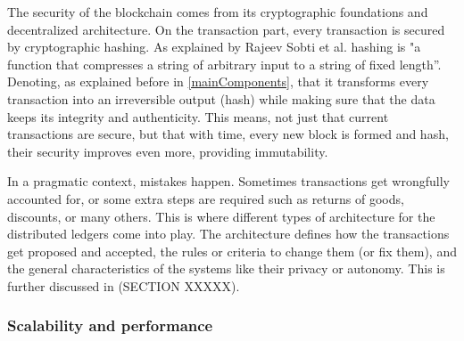 The security of the blockchain comes from its cryptographic foundations and decentralized architecture. On the transaction part, every transaction is secured by cryptographic hashing. As explained by Rajeev Sobti et al. \cite{hashingDefinition} hashing is "a function that compresses a string of arbitrary input to a string of fixed length”. Denoting, as explained before in \cref{mainComponents}, that it transforms every transaction into an irreversible output (hash) while making sure that the data keeps its integrity and authenticity. This means, not just that current transactions are secure, but that with time, every new block is formed and hash, their security improves even more, providing immutability.

In a pragmatic context, mistakes happen. Sometimes transactions get wrongfully accounted for, or some extra steps are required such as returns of goods, discounts, or many others. This is where different types of architecture for the distributed ledgers come into play. The architecture defines how the transactions get proposed and accepted, the rules or criteria to change them (or fix them), and the general characteristics of the systems like their privacy or autonomy. This is further discussed in (SECTION XXXXX). 

\subsubsection{Scalability and performance}

